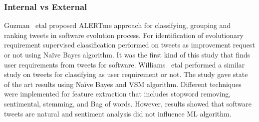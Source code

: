 % 
% 
\subsubsection{Internal vs External}

Guzman ~etal \cite{Guzman:2017} proposed ALERTme approach for classifying,
grouping and ranking tweets in software evolution process. For identification of
evolutionary requirement supervised classification performed on tweets as
improvement request or not using Naïve Bayes algorithm. It was the first kind of
this study that finds user requirements from tweets for software. Williams ~etal
 \cite{Williams:2017} performed a similar study on
tweets for classifying as user requirement or not. The study gave state of the art results using Naïve Bayes
and VSM algorithm. Different techniques were implemented for feature extraction
that includes stopword removing, sentimental, stemming, and Bag of words.
However, results showed that software tweets are natural  and sentiment analysis did not influence ML algorithm.\\

